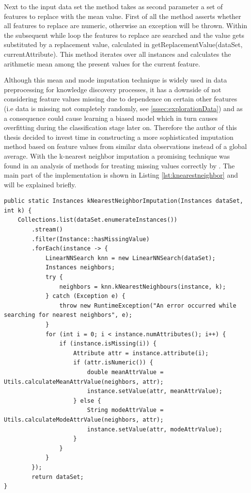 Next to the input data set the method takes as second parameter a set of features to replace with the mean value. First of all the method asserts whether all features to replace are numeric, otherwise an exception will be thrown. Within the subsequent while loop the features to replace are searched and the value gets substituted by a replacement value, calculated in getReplacementValue(dataSet, currentAttribute). This method iterates over all instances and calculates the arithmetic mean among the present values for the current feature.

Although this mean and mode imputation technique is widely used in data preprocessing for knowledge discovery processes, it has a downside of not considering feature values missing due to dependence on certain other features (i.e data is missing not completely randomly, see \ref{sssec:explorationData}) and as a consequence could cause learning a biased model which in turn causes overfitting during the classification stage later on. Therefore the author of this thesis decided to invest time in constructing a more sophisticated imputation method based on feature values from similar data observations instead of a global average. With the k-nearest neighbor imputation a  promising technique was found in an analysis of methods for treating missing values correctly by \cite{batista2003analysis}. The main part of the implementation is shown in Listing \ref{lst:knearestneighbor} and will be explained briefly. 

\begin{lstlisting}[caption={K-nearest neighbor imputation}, label={lst:knearestneighbor}]
public static Instances kNearestNeighborImputation(Instances dataSet, int k) {
	Collections.list(dataSet.enumerateInstances())
		.stream()
		.filter(Instance::hasMissingValue)
		.forEach(instance -> {
			LinearNNSearch knn = new LinearNNSearch(dataSet);
			Instances neighbors;
			try {
				neighbors = knn.kNearestNeighbours(instance, k);
			} catch (Exception e) {
				throw new RuntimeException("An error occurred while searching for nearest neighbors", e);
			}
			for (int i = 0; i < instance.numAttributes(); i++) {
				if (instance.isMissing(i)) {
					Attribute attr = instance.attribute(i);
					if (attr.isNumeric()) {
						double meanAttrValue = Utils.calculateMeanAttrValue(neighbors, attr);
						instance.setValue(attr, meanAttrValue);
					} else {
						String modeAttrValue = Utils.calculateModeAttrValue(neighbors, attr);
						instance.setValue(attr, modeAttrValue);
					}
				}
			}
		});
		return dataSet;
}
\end{lstlisting}

